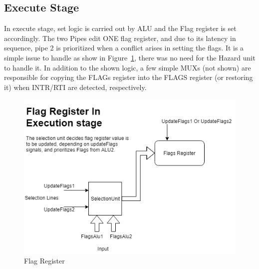 \documentclass[12pt]{article}
\theoremstyle{plain}
\theoremstyle{definition}
\begin{document}
\subsection{Execute Stage}
In execute stage, set logic is carried out by ALU and the Flag register is set accordingly. The two Pipes edit ONE flag register, and due to its latency in sequence, pipe 2 is prioritized when a conflict arises in setting the flags. It is a simple issue to handle as show in Figure~\ref{flag-reg}, there was no need for the Hazard unit to handle it. In addition to the shown logic, a few simple MUXs (not shown) are responsible for copying the FLAGs register into the FLAGS register (or restoring it) when INTR/RTI are detected, respectively.
\begin{figure}
    \centering
    \includegraphics[width=\textwidth,keepaspectratio]{Diagrams/FlagRegister.png}
    \caption{Flag Register}
    \label{flag-reg}
\end{figure}
\end{document}
